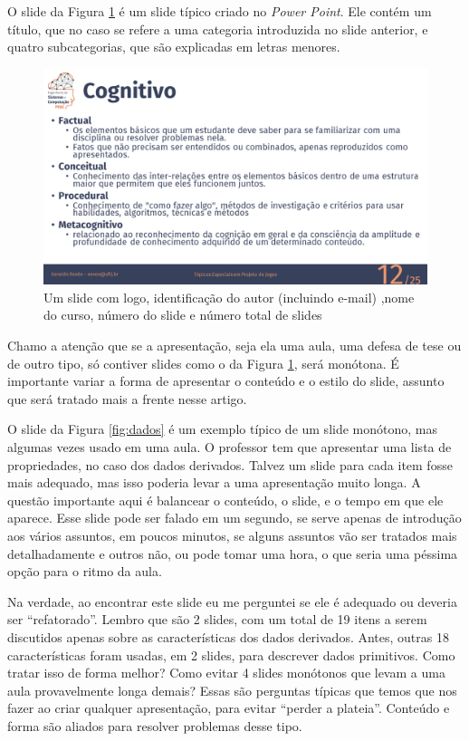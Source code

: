 O slide da Figura \ref{fig:coppe} é um slide típico criado no \textit{Power Point}. Ele contém um título, que no caso se refere a uma categoria introduzida no slide anterior, e quatro subcategorias, que são explicadas em letras menores.

\begin{figure}[htb]
    \centering
    \includegraphics[width=\tam\linewidth,frame]{imagens/slideexemplotepj.png}
    \caption{Um slide com logo, identificação do autor (incluindo e-mail) ,nome do curso,   número do slide e número total de slides}
    \label{fig:coppe}
\end{figure}

Chamo a atenção que se a apresentação, seja ela uma aula, uma defesa de tese ou de outro tipo, só contiver slides como o da Figura \ref{fig:coppe},  será monótona. É importante variar a forma de apresentar o conteúdo e o estilo do slide, assunto que será tratado mais a frente nesse artigo.

O slide da Figura \ref{fig:dados} é um exemplo típico de um slide monótono, mas algumas vezes usado em uma aula. O professor tem que apresentar uma lista de propriedades, no caso dos dados derivados. Talvez um slide para cada item fosse mais adequado, mas isso poderia levar a uma apresentação muito longa. A questão importante aqui é balancear o conteúdo, o slide, e o tempo em que ele aparece. Esse slide pode ser falado em um segundo, se serve apenas de introdução aos vários assuntos, em poucos minutos, se alguns assuntos vão ser tratados mais detalhadamente e outros não, ou pode tomar uma hora, o que seria uma péssima opção para o ritmo da aula.

Na verdade, ao encontrar este slide eu me perguntei se ele é adequado ou deveria ser ``refatorado''. Lembro que são 2 slides, com um total de 19 itens a serem discutidos apenas sobre as características dos dados derivados. Antes, outras 18 características foram usadas, em 2 slides, para descrever dados primitivos. Como tratar isso de forma melhor? Como evitar 4 slides monótonos que levam a uma aula provavelmente longa demais? Essas são perguntas típicas que temos que nos fazer ao criar qualquer apresentação, para evitar ``perder a plateia''. Conteúdo e forma são aliados para resolver problemas desse tipo.

